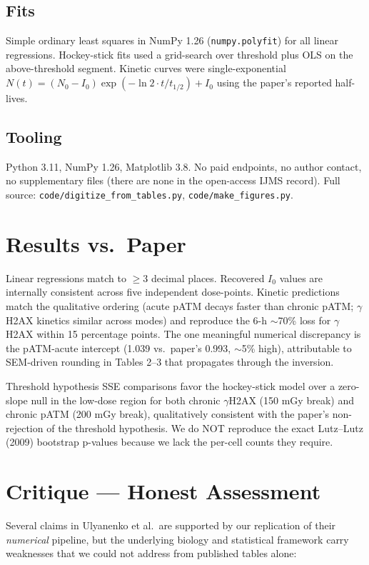 \documentclass[11pt]{article}
\begin{document}
\subsection{Fits}
Simple ordinary least squares in NumPy 1.26 (\texttt{numpy.polyfit}) for all linear
regressions. Hockey-stick fits used a grid-search over threshold plus OLS on the
above-threshold segment. Kinetic curves were single-exponential
$N(t) = (N_0 - I_0)\exp(-\ln 2 \cdot t / t_{1/2}) + I_0$ using the paper's reported
half-lives.

\subsection{Tooling}
Python 3.11, NumPy 1.26, Matplotlib 3.8. No paid endpoints, no author contact, no
supplementary files (there are none in the open-access IJMS record). Full source:
\texttt{code/digitize\_from\_tables.py}, \texttt{code/make\_figures.py}.

\section{Results vs.\ Paper}

Linear regressions match to $\geq 3$ decimal places. Recovered $I_0$ values are
internally consistent across five independent dose-points. Kinetic predictions match
the qualitative ordering (acute pATM decays faster than chronic pATM; $\gamma$H2AX
kinetics similar across modes) and reproduce the 6-h $\sim$70\% loss for $\gamma$H2AX
within 15 percentage points. The one meaningful numerical discrepancy is the pATM-acute
intercept (1.039 vs.\ paper's 0.993, $\sim$5\% high), attributable to SEM-driven rounding
in Tables 2--3 that propagates through the inversion.

Threshold hypothesis SSE comparisons favor the hockey-stick model over a zero-slope null
in the low-dose region for both chronic $\gamma$H2AX (150 mGy break) and chronic pATM
(200 mGy break), qualitatively consistent with the paper's non-rejection of the
threshold hypothesis. We do NOT reproduce the exact Lutz--Lutz (2009) bootstrap p-values
because we lack the per-cell counts they require.

\section{Critique --- Honest Assessment}

Several claims in Ulyanenko et al.\ are supported by our replication of their
\emph{numerical} pipeline, but the underlying biology and statistical framework carry
weaknesses that we could not address from published tables alone:
\end{document}
